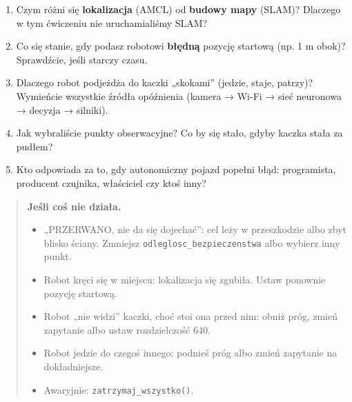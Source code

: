 \begin{enumerate}
\def\labelenumi{\arabic{enumi}.}
\tightlist
\item
  Czym różni się \textbf{lokalizacja} (AMCL) od \textbf{budowy mapy} (SLAM)? Dlaczego w tym ćwiczeniu nie uruchamialiśmy SLAM?
\item
  Co się stanie, gdy podasz robotowi \textbf{błędną} pozycję startową (np. 1 m obok)? Sprawdźcie, jeśli starczy czasu.
\item
  Dlaczego robot podjeżdża do kaczki „skokami'' (jedzie, staje, patrzy)? Wymieńcie wszystkie źródła opóźnienia (kamera → Wi-Fi → sieć neuronowa → decyzja → silniki).
\item
  Jak wybraliście punkty obserwacyjne? Co by się stało, gdyby kaczka stała za pudłem?
\item
  Kto odpowiada za to, gdy autonomiczny pojazd popełni błąd: programista, producent czujnika, właściciel czy ktoś inny?
\end{enumerate}

\begin{quote}
\textbf{Jeśli coś nie działa.}

\begin{itemize}
\tightlist
\item
  „PRZERWANO, nie da się dojechać'': cel leży w przeszkodzie albo zbyt blisko ściany. Zmniejsz \texttt{odleglosc\_bezpieczenstwa} albo wybierz inny punkt.
\item
  Robot kręci się w miejscu: lokalizacja się zgubiła. Ustaw ponownie pozycję startową.
\item
  Robot „nie widzi'' kaczki, choć stoi ona przed nim: obniż próg, zmień zapytanie albo ustaw rozdzielczość 640.
\item
  Robot jedzie do czegoś innego: podnieś próg albo zmień zapytanie na dokładniejsze.
\item
  Awaryjnie: \texttt{zatrzymaj\_wszystko()}.
\end{itemize}
\end{quote}
